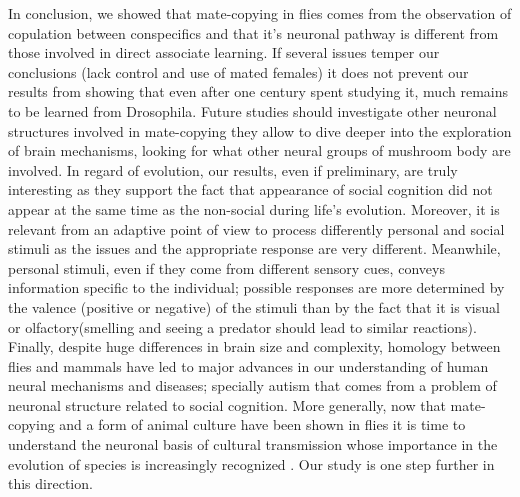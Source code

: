 \documentclass[a4paper, 12pt]{article}
\begin{document}
In conclusion, we showed that mate-copying in flies comes from the observation of copulation between conspecifics and that it's neuronal pathway is different from those involved in direct associate learning. If several issues temper our conclusions (lack control and use of mated females) 
it does not prevent our results from showing that even after one century spent studying it, much remains to be learned from Drosophila. Future studies should investigate other neuronal structures involved in mate-copying
they allow to dive deeper into the exploration of brain mechanisms, looking for what other neural groups of mushroom body are involved.
In regard of evolution, our results, even if preliminary, are truly interesting as they support the fact that appearance of social cognition did not appear at the same time as the non-social  during life's evolution. 
Moreover, it is relevant from an adaptive point of view  to process differently personal and social stimuli as the issues and the appropriate response are very different. Meanwhile, personal stimuli, even if they come from different sensory cues, conveys information specific to the individual; possible responses are more determined by the valence (positive or negative) of the stimuli than by the fact that it is visual or olfactory(smelling and seeing a predator should lead to similar reactions).
Finally, despite huge differences in brain size and complexity, homology between flies and mammals have led to major advances in our understanding of human neural mechanisms and diseases; specially autism that comes from a problem of neuronal structure related to social cognition. 
More generally, now that mate-copying and a form of animal culture have been shown in flies it is time to understand the neuronal basis of cultural transmission whose importance in the evolution of species is increasingly recognized \parencite{danchin_public_2004}.
Our study is one step further in this direction. 










\clearpage
\newrefcontext[sorting=nyt] %
\printbibliography
 
\end{document}

